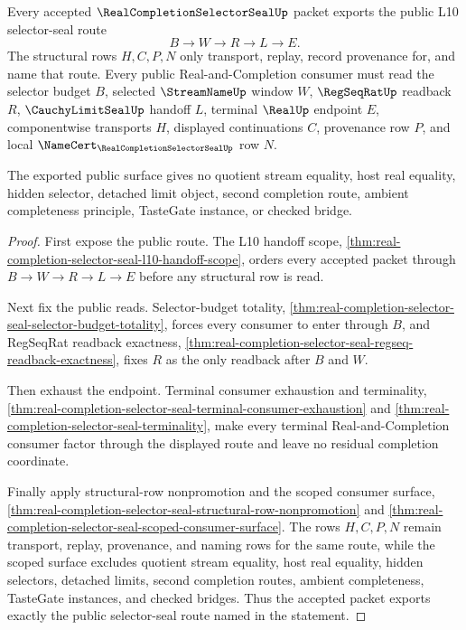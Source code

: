 \begin{theorem}
\label{thm:real-completion-selector-seal-public-route-export}
Every accepted $\RealCompletionSelectorSealUp$ packet exports the public L10 selector-seal route
$$
B \to W \to R \to L \to E.
$$
The structural rows $H,C,P,N$ only transport, replay, record provenance for, and name that route. Every public Real-and-Completion consumer must read the selector budget $B$, selected $\StreamNameUp$ window $W$, $\RegSeqRatUp$ readback $R$, $\CauchyLimitSealUp$ handoff $L$, terminal $\RealUp$ endpoint $E$, componentwise transports $H$, displayed continuations $C$, provenance row $P$, and local $\NameCert_{\RealCompletionSelectorSealUp}$ row $N$.

The exported public surface gives no quotient stream equality, host real equality, hidden selector, detached limit object, second completion route, ambient completeness principle, TasteGate instance, or checked bridge.
\end{theorem}
\begin{proof}
First expose the public route. The L10 handoff scope, \autoref{thm:real-completion-selector-seal-l10-handoff-scope}, orders every accepted packet through $B \to W \to R \to L \to E$ before any structural row is read.

Next fix the public reads. Selector-budget totality, \autoref{thm:real-completion-selector-seal-selector-budget-totality}, forces every consumer to enter through $B$, and RegSeqRat readback exactness, \autoref{thm:real-completion-selector-seal-regseq-readback-exactness}, fixes $R$ as the only readback after $B$ and $W$.

Then exhaust the endpoint. Terminal consumer exhaustion and terminality, \autoref{thm:real-completion-selector-seal-terminal-consumer-exhaustion} and \autoref{thm:real-completion-selector-seal-terminality}, make every terminal Real-and-Completion consumer factor through the displayed route and leave no residual completion coordinate.

Finally apply structural-row nonpromotion and the scoped consumer surface, \autoref{thm:real-completion-selector-seal-structural-row-nonpromotion} and \autoref{thm:real-completion-selector-seal-scoped-consumer-surface}. The rows $H,C,P,N$ remain transport, replay, provenance, and naming rows for the same route, while the scoped surface excludes quotient stream equality, host real equality, hidden selectors, detached limits, second completion routes, ambient completeness, TasteGate instances, and checked bridges. Thus the accepted packet exports exactly the public selector-seal route named in the statement.
\end{proof}

